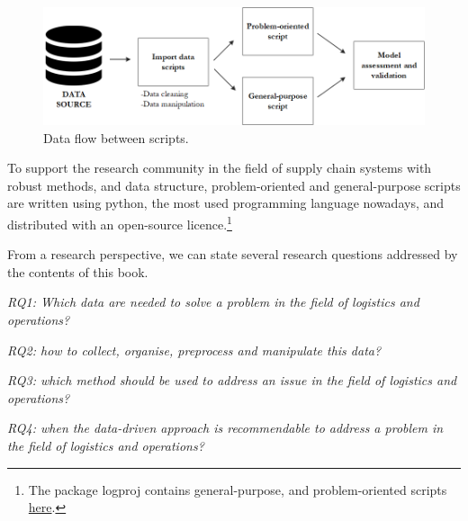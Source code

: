 \begin{figure}[hbt!]
\centering
\includegraphics[width=1\textwidth]{SectionIntroduction/dataDrivenDecisions_fig/fig_data_flow.png}
\captionsetup{type=figure}
\caption{Data flow between scripts.}
\label{fig_data_flow}
\end{figure}

To support the research community in the field of supply chain systems with robust methods, and data structure, problem-oriented and general-purpose scripts are written using python, the most used programming language nowadays, and distributed with an open-source licence.\footnote{The package logproj contains general-purpose, and problem-oriented scripts \href{https://github.com/aletuf93/logproj}{here}.}

From a research perspective, we can state several research questions addressed by the contents of this book.

\textit{RQ1: Which data are needed to solve a problem in the field of logistics and operations?}\bigskip

\textit{RQ2: how to collect, organise, preprocess and manipulate this data?}\bigskip

\textit{RQ3: which method should be used to address an issue in the field of logistics and operations?}\bigskip

\textit{RQ4:  when the data-driven approach is recommendable to address a problem in the field of logistics and operations?}\bigskip

